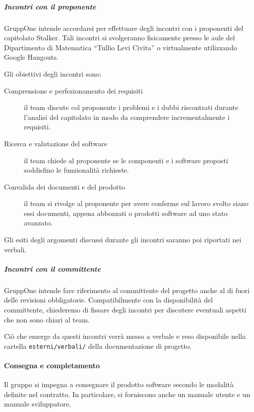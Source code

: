 \documentclass[../../norme-di-progetto.tex]{subfiles}
\begin{document}
\subparagraph{Incontri con il proponente}%
\label{subp:incontri_con_il_proponente}

GruppOne intende accordarsi per effettuare degli incontri con i proponenti del capitolato Stalker.
Tali incontri si svolgeranno fisicamente presso le aule del Dipartimento di Matematica ``Tullio Levi Civita'' o virtualmente utilizzando Google Hangouts.

Gli obiettivi degli incontri sono:
\begin{description}
  \item [Comprensione e perfezionamento dei requisiti] il team discute col proponente i problemi e i dubbi riscontrati durante l'analisi del capitolato in modo da comprendere incrementalmente i requisiti.
  \item [Ricerca e valutazione del software] il team chiede al proponente se le componenti e i software proposti soddisfino le funzionalità richieste.
  \item [Convalida dei documenti e del prodotto] il team si rivolge al proponente per avere conferme sul lavoro svolto siano essi documenti,  appena abbozzati o prodotti software ad uno stato avanzato.
\end{description}
Gli esiti degli argomenti discussi durante gli incontri saranno poi riportati nei verbali.

\subparagraph{Incontri con il committente}%
\label{subp:incontri_con_il_committente}

GruppOne intende fare riferimento al committente del progetto anche al di fuori delle revisioni obbligatorie.
Compatibilmente con la disponibilità del committente, chiederemo di fissare degli incontri per discutere eventuali aspetti che non sono chiari al team.

Ciò che emerge da questi incontri verrà messo a verbale e reso disponibile nella cartella \verb|esterni/verbali/| della documentazione di progetto.

\paragraph{Consegna e completamento}%
\label{par:consegna e completamento}

Il gruppo si impegna a consegnare il prodotto software secondo le modalità definite nel contratto. In particolare, si forniscono anche un manuale utente e un manuale sviluppatore.


\end{document}
